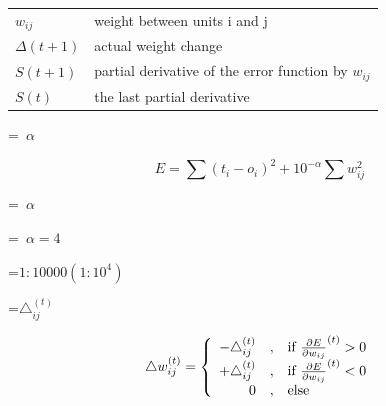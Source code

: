 {\newpage
\clearpage
\samepage \begin{tabular}{ll}
  $w_{ij}$      & weight between units i and j\\ 
  $\Delta(t+1)$ & actual weight change\\ 
  $S(t+1)$      & partial derivative of the error function by $w_{ij}$\\ 
  $S(t)$        & the last partial derivative\\ 
\end{tabular}
}

{\newpage
\clearpage
\samepage \setbox\sizebox=\hbox{%
$\alpha$}\box\sizebox
}

{\newpage
\clearpage
\samepage \begin{displaymath}%
E = \sum (t_i - o_i)^2 + 10^{-\alpha} \sum w_{ij}^2 \end{displaymath}
}

{\newpage
\clearpage
\samepage \setbox\sizebox=\hbox{%
$\alpha$}\box\sizebox
}

{\newpage
\clearpage
\samepage \setbox\sizebox=\hbox{%
$\alpha = 4$}\box\sizebox
}

{\newpage
\clearpage
\samepage \setbox\sizebox=\hbox{$1:10000 (1:10^4)$}\box\sizebox
}

{\newpage
\clearpage
\samepage \setbox\sizebox=\hbox{$\triangle_{ij}^{(t)}$}\box\sizebox
}

{\newpage
\clearpage
\samepage \begin{eqnarray}\label{man} \triangle w_{ij}^{(t)} = \left\{ \begin{array}{r@{\quad,\quad}l}
                    -\triangle_{ij}^{(t)} & \mbox{if } \frac{\partial E}{\partial w_{ij}}^{(t)} > 0
   \\ 
                    +\triangle_{ij}^{(t)} & \mbox{if } \frac{\partial E}{\partial w_{ij}}^{(t)} < 0
   \\ 
                    0 & \mbox{else }
                   \end{array} \right.
\end{eqnarray}
}

